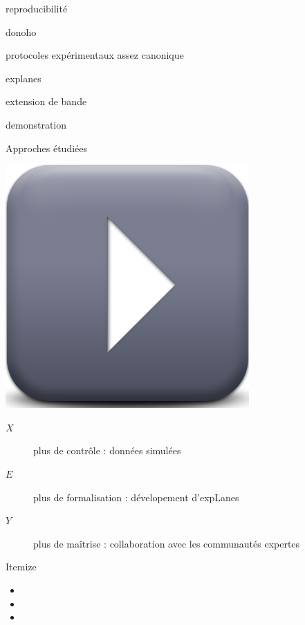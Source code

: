 reproducibilité

donoho

protocoles expérimentaux assez canonique

explanes

extension de bande

demonstration






\begin{frame}{Approches étudiées}
\begin{center}
\includegraphics[width=.3\columnwidth]{figures/play} \\
\end{center}
\begin{description}
\item[$X$] plus de contrôle : données simulées
\item[$E$] plus de formalisation : dévelopement d'expLanes
\item[$Y$] plus de maîtrise : collaboration avec les communautés expertes
\end{description}
\end{frame}

\begin{frame}{Itemize}
\begin{itemize}
\item
\item
\item
\end{itemize}
\end{frame}
